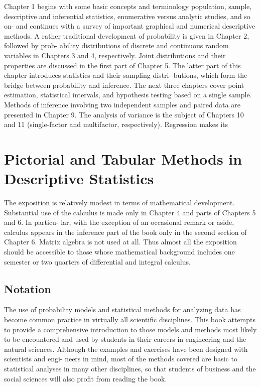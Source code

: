 \documentclass{book}
\begin{document}
Chapter 1 begins with some basic concepts and terminology population, sample, descriptive and inferential statistics, enumerative versus analytic studies, and so on- and continues with a survey of important graphical and numerical descriptive methods. A rather traditional development of probability is given in Chapter 2, followed by prob- ability distributions of discrete and continuous random variables in Chapters 3 and 4, respectively. Joint distributions and their properties are discussed in the first part of Chapter 5. The latter part of this chapter introduces statistics and their sampling distri- butions, which form the bridge between probability and inference. The next three chapters cover point estimation, statistical intervals, and hypothesis testing based on a single sample. Methods of inference involving two independent samples and paired data are presented in Chapter 9. The analysis of variance is the subject of Chapters 10 and 11 (single-factor and multifactor, respectively). Regression makes its 
\section{Pictorial and Tabular Methods in Descriptive Statistics}
The exposition is relatively modest in terms of mathematical development. Substantial use of the calculus is made only in Chapter 4 and parts of Chapters 5 and 6. In particu- lar, with the exception of an occasional remark or aside, calculus appears in the inference part of the book only in the second section of Chapter 6. Matrix algebra is not used at all. Thus almost all the exposition should be accessible to those whose mathematical background includes one semester or two quarters of differential and integral calculus. 
\subsection{Notation}
The use of probability models and statistical methods for analyzing data has become common practice in virtually all scientific disciplines. This book attempts to provide a comprehensive introduction to those models and methods most likely to be encountered and used by students in their careers in engineering and the natural sciences. Although the examples and exercises have been designed with scientists and engi- neers in mind, most of the methods covered are basic to statistical analyses in many other disciplines, so that students of business and the social sciences will also profit from reading the book.
\end{document}
